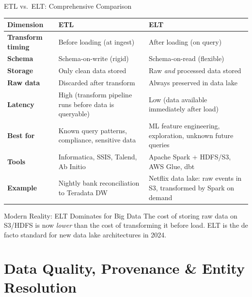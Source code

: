 \documentclass[aspectratio=169,10pt]{beamer}
\begin{document}
\begin{frame}{ETL vs.\ ELT: Comprehensive Comparison}
  \centering
  \renewcommand{\arraystretch}{1.45}
  \begin{tabular}{p{2.8cm}p{5cm}p{5cm}}
    \toprule
    \textbf{Dimension} & \textbf{ETL} & \textbf{ELT} \\
    \midrule
    \textbf{Transform timing} & Before loading (at ingest) & After loading (on query) \\
    \textbf{Schema} & Schema-on-write (rigid) & Schema-on-read (flexible) \\
    \textbf{Storage} & Only clean data stored & Raw \emph{and} processed data stored \\
    \textbf{Raw data} & Discarded after transform & Always preserved in data lake \\
    \textbf{Latency} & High (transform pipeline runs before data is queryable) & Low (data available immediately after load) \\
    \textbf{Best for} & Known query patterns, compliance, sensitive data & ML feature engineering, exploration, unknown future queries \\
    \textbf{Tools} & Informatica, SSIS, Talend, Ab Initio & Apache Spark + HDFS/S3, AWS Glue, dbt \\
    \textbf{Example} & Nightly bank reconciliation to Teradata DW & Netflix data lake: raw events in S3, transformed by Spark on demand \\
    \bottomrule
  \end{tabular}
  \vspace{6pt}
  \begin{alertblock}{Modern Reality: ELT Dominates for Big Data}
    The cost of storing raw data on S3/HDFS is now \emph{lower} than the cost of transforming it before load.  ELT is the de facto standard for new data lake architectures in 2024.
  \end{alertblock}
\end{frame}

\section{Data Quality, Provenance \& Entity Resolution}
\end{document}
